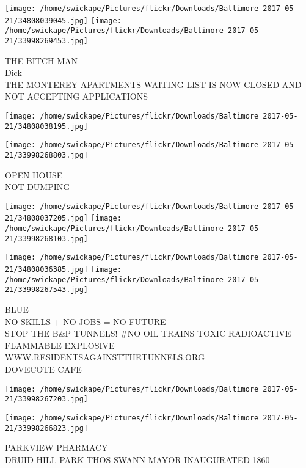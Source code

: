 \documentclass[10pt,letterpaper]{article}
\begin{document}
\vspace{0.25in}
\texttt{[image: /home/swickape/Pictures/flickr/Downloads/Baltimore 2017-05-21/34808039045.jpg]}
\texttt{[image: /home/swickape/Pictures/flickr/Downloads/Baltimore 2017-05-21/33998269453.jpg]}

THE BITCH MAN\\
Dick\\
THE MONTEREY APARTMENTS WAITING LIST IS NOW CLOSED AND NOT ACCEPTING APPLICATIONS\\
\pagebreak

\texttt{[image: /home/swickape/Pictures/flickr/Downloads/Baltimore 2017-05-21/34808038195.jpg]}

\vspace{0.25in}
\texttt{[image: /home/swickape/Pictures/flickr/Downloads/Baltimore 2017-05-21/33998268803.jpg]}

OPEN HOUSE\\
NOT DUMPING\\
\pagebreak

\texttt{[image: /home/swickape/Pictures/flickr/Downloads/Baltimore 2017-05-21/34808037205.jpg]}
\texttt{[image: /home/swickape/Pictures/flickr/Downloads/Baltimore 2017-05-21/33998268103.jpg]}

\texttt{[image: /home/swickape/Pictures/flickr/Downloads/Baltimore 2017-05-21/34808036385.jpg]}
\texttt{[image: /home/swickape/Pictures/flickr/Downloads/Baltimore 2017-05-21/33998267543.jpg]}

BLUE\\
NO SKILLS + NO JOBS = NO FUTURE\\
STOP THE B\&P TUNNELS!  \#NO OIL TRAINS TOXIC RADIOACTIVE FLAMMABLE EXPLOSIVE WWW.RESIDENTSAGAINSTTHETUNNELS.ORG\\
DOVECOTE CAFE\\
\pagebreak

\texttt{[image: /home/swickape/Pictures/flickr/Downloads/Baltimore 2017-05-21/33998267203.jpg]}

\vspace{0.25in}
\texttt{[image: /home/swickape/Pictures/flickr/Downloads/Baltimore 2017-05-21/33998266823.jpg]}

PARKVIEW PHARMACY\\
DRUID HILL PARK THOS SWANN MAYOR INAUGURATED 1860\\
\pagebreak
\end{document}
